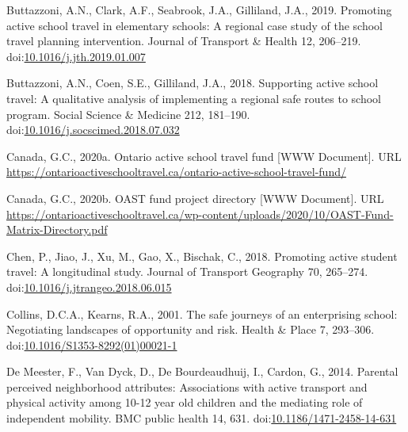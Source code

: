 \documentclass[]{elsarticle} %
\newlength{\cslhangindent}
\newlength{\cslentryspacingunit} %
\newenvironment{CSLReferences}[2] %
 {%
  \setlength{\parindent}{0pt}
  \ifodd #1
  \let\oldpar\par
  \def\par{\hangindent=\cslhangindent\oldpar}
  \fi
  \setlength{\parskip}{#2\cslentryspacingunit}
 }%
 {}
\begin{document}
\begin{CSLReferences}{1}{0}
\leavevmode{}%
Buttazzoni, A.N., Clark, A.F., Seabrook, J.A., Gilliland, J.A., 2019.
Promoting active school travel in elementary schools: A regional case
study of the school travel planning intervention. Journal of Transport
\& Health 12, 206--219.
doi:\href{https://doi.org/10.1016/j.jth.2019.01.007}{10.1016/j.jth.2019.01.007}

\leavevmode{}%
Buttazzoni, A.N., Coen, S.E., Gilliland, J.A., 2018. Supporting active
school travel: A qualitative analysis of implementing a regional safe
routes to school program. Social Science \& Medicine 212, 181--190.
doi:\href{https://doi.org/10.1016/j.socscimed.2018.07.032}{10.1016/j.socscimed.2018.07.032}

\leavevmode{}%
Canada, G.C., 2020a. Ontario active school travel fund {[}WWW
Document{]}. URL
\url{https://ontarioactiveschooltravel.ca/ontario-active-school-travel-fund/}

\leavevmode{}%
Canada, G.C., 2020b. OAST fund project directory {[}WWW Document{]}. URL
\url{https://ontarioactiveschooltravel.ca/wp-content/uploads/2020/10/OAST-Fund-Matrix-Directory.pdf}

\leavevmode{}%
Chen, P., Jiao, J., Xu, M., Gao, X., Bischak, C., 2018. Promoting active
student travel: A longitudinal study. Journal of Transport Geography 70,
265--274.
doi:\href{https://doi.org/10.1016/j.jtrangeo.2018.06.015}{10.1016/j.jtrangeo.2018.06.015}

\leavevmode{}%
Collins, D.C.A., Kearns, R.A., 2001. The safe journeys of an
enterprising school: Negotiating landscapes of opportunity and risk.
Health \& Place 7, 293--306.
doi:\href{https://doi.org/10.1016/S1353-8292(01)00021-1}{10.1016/S1353-8292(01)00021-1}

\leavevmode{}%
De Meester, F., Van Dyck, D., De Bourdeaudhuij, I., Cardon, G., 2014.
Parental perceived neighborhood attributes: Associations with active
transport and physical activity among 10-12 year old children and the
mediating role of independent mobility. BMC public health 14, 631.
doi:\href{https://doi.org/10.1186/1471-2458-14-631}{10.1186/1471-2458-14-631}


\end{CSLReferences}
\end{document}
